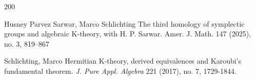 \documentclass[12pt]{article}
\begin{document}
\begin{thebibliography}{200}
  
   










Husney Parvez Sarwar, Marco Schlichting
The third homology of symplectic groups and algebraic K-theory, with H. P. Sarwar. Amer. J. Math. 147 (2025), no. 3, 819–867

Schlichting, Marco Hermitian K-theory, derived equivalences and Karoubi's fundamental theorem. {\it J. Pure Appl. Algebra}
 221 (2017), no. 7, 1729-1844.

 


  
   




\end{thebibliography}
\end{document}
